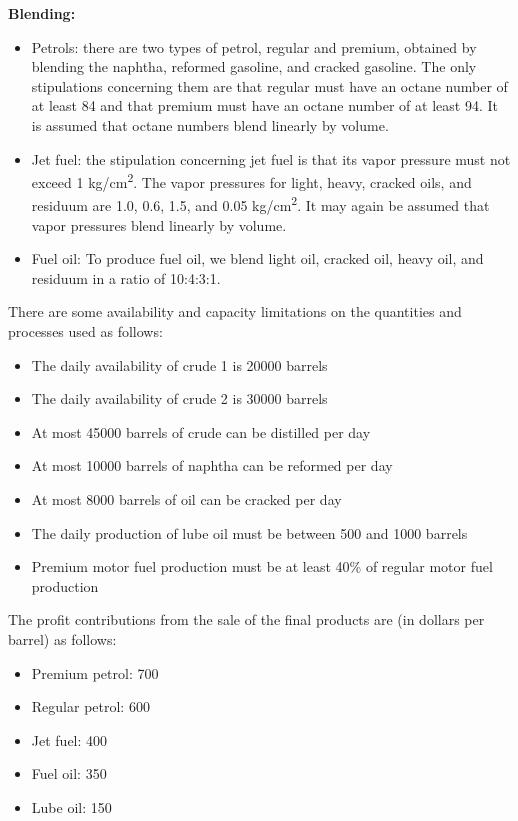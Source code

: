 \documentclass[11pt]{article}
\begin{document}
\textbf{Blending:}
\begin{itemize}
    \item Petrols: there are two types of petrol, regular and premium, obtained by blending the naphtha, reformed gasoline, and cracked gasoline. The only stipulations concerning them are that regular must have an octane number of at least 84 and that premium must have an octane number of at least 94. It is assumed that octane numbers blend linearly by volume.
    \item Jet fuel: the stipulation concerning jet fuel is that its vapor pressure must not exceed 1 kg/cm\textsuperscript{2}. The vapor pressures for light, heavy, cracked oils, and residuum are 1.0, 0.6, 1.5, and 0.05 kg/cm\textsuperscript{2}. It may again be assumed that vapor pressures blend linearly by volume.
    \item Fuel oil: To produce fuel oil, we blend light oil, cracked oil, heavy oil, and residuum in a ratio of 10:4:3:1.
\end{itemize}

There are some availability and capacity limitations on the quantities and processes used as follows:
\begin{itemize}
    \item The daily availability of crude 1 is 20000 barrels
    \item The daily availability of crude 2 is 30000 barrels
    \item At most 45000 barrels of crude can be distilled per day
    \item At most 10000 barrels of naphtha can be reformed per day
    \item At most 8000 barrels of oil can be cracked per day
    \item The daily production of lube oil must be between 500 and 1000 barrels
    \item Premium motor fuel production must be at least 40\% of regular motor fuel production
\end{itemize}

The profit contributions from the sale of the final products are (in dollars per barrel) as follows:
\begin{itemize}
    \item Premium petrol: 700
    \item Regular petrol: 600
    \item Jet fuel: 400
    \item Fuel oil: 350
    \item Lube oil: 150
\end{itemize}
\end{document}
